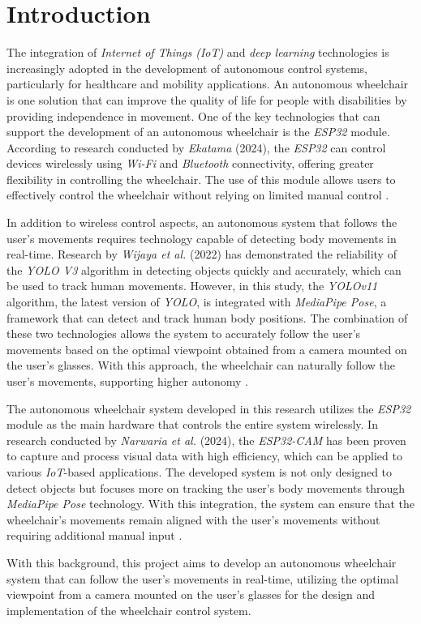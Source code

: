 \section{Introduction}
\label{sec:introduction}


The integration of \emph{Internet of Things (IoT)} and \emph{deep learning} technologies is increasingly adopted in the development of autonomous control systems, particularly for healthcare and mobility applications. An autonomous wheelchair is one solution that can improve the quality of life for people with disabilities by providing independence in movement. One of the key technologies that can support the development of an autonomous wheelchair is the \emph{ESP32} module. According to research conducted by \emph{Ekatama} (2024), the \emph{ESP32} can control devices wirelessly using \emph{Wi-Fi} and \emph{Bluetooth} connectivity, offering greater flexibility in controlling the wheelchair. The use of this module allows users to effectively control the wheelchair without relying on limited manual control \cite{ekatama2024perancangan}.

In addition to wireless control aspects, an autonomous system that follows the user's movements requires technology capable of detecting body movements in real-time. Research by \emph{Wijaya et al.} (2022) has demonstrated the reliability of the \emph{YOLO V3} algorithm in detecting objects quickly and accurately, which can be used to track human movements. However, in this study, the \emph{YOLOv11} algorithm, the latest version of \emph{YOLO}, is integrated with \emph{MediaPipe Pose}, a framework that can detect and track human body positions. The combination of these two technologies allows the system to accurately follow the user's movements based on the optimal viewpoint obtained from a camera mounted on the user's glasses. With this approach, the wheelchair can naturally follow the user's movements, supporting higher autonomy \cite{wijaya2022deteksi}.

The autonomous wheelchair system developed in this research utilizes the \emph{ESP32} module as the main hardware that controls the entire system wirelessly. In research conducted by \emph{Narwaria et al.} (2024), the \emph{ESP32-CAM} has been proven to capture and process visual data with high efficiency, which can be applied to various \emph{IoT}-based applications. The developed system is not only designed to detect objects but focuses more on tracking the user's body movements through \emph{MediaPipe Pose} technology. With this integration, the system can ensure that the wheelchair's movements remain aligned with the user's movements without requiring additional manual input \cite{10696374}.

With this background, this project aims to develop an autonomous wheelchair system that can follow the user's movements in real-time, utilizing the optimal viewpoint from a camera mounted on the user's glasses for the design and implementation of the wheelchair control system.